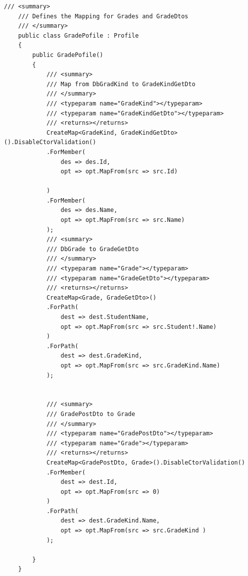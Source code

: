 \newpage
\begin{lstlisting}[language={[Sharp]C}, caption=Definitation for Mapping, label=lst:imp:profile]
    /// <summary>
    /// Defines the Mapping for Grades and GradeDtos
    /// </summary>
    public class GradePofile : Profile
    {
        public GradePofile()
        {
            /// <summary>
            /// Map from DbGradKind to GradeKindGetDto
            /// </summary>
            /// <typeparam name="GradeKind"></typeparam>
            /// <typeparam name="GradeKindGetDto"></typeparam>
            /// <returns></returns>
            CreateMap<GradeKind, GradeKindGetDto>().DisableCtorValidation()
            .ForMember(
                des => des.Id,
                opt => opt.MapFrom(src => src.Id)
                
            )
            .ForMember(
                des => des.Name,
                opt => opt.MapFrom(src => src.Name)
            );
            /// <summary>
            /// DbGrade to GradeGetDto
            /// </summary>
            /// <typeparam name="Grade"></typeparam>
            /// <typeparam name="GradeGetDto"></typeparam>
            /// <returns></returns>
            CreateMap<Grade, GradeGetDto>()
            .ForPath(
                dest => dest.StudentName,
                opt => opt.MapFrom(src => src.Student!.Name)
            )
            .ForPath(
                dest => dest.GradeKind,
                opt => opt.MapFrom(src => src.GradeKind.Name)
            );


            /// <summary>
            /// GradePostDto to Grade
            /// </summary>
            /// <typeparam name="GradePostDto"></typeparam>
            /// <typeparam name="Grade"></typeparam>
            /// <returns></returns>
            CreateMap<GradePostDto, Grade>().DisableCtorValidation()
            .ForMember(
                dest => dest.Id, 
                opt => opt.MapFrom(src => 0)
            )
            .ForPath(
                dest => dest.GradeKind.Name,
                opt => opt.MapFrom(src => src.GradeKind ) 
            );
            
        }
    }
\end{lstlisting}

\newpage

